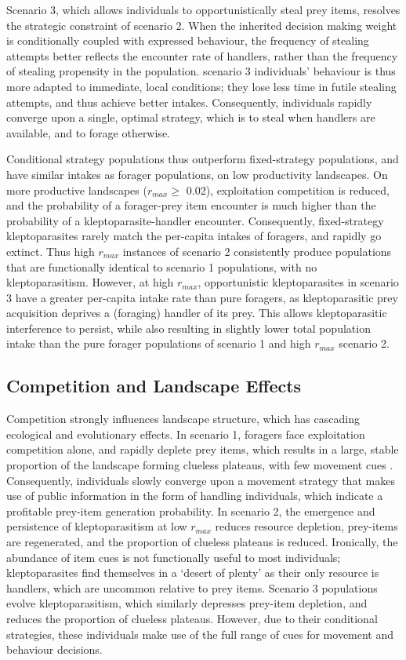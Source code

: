 \documentclass[11pt]{article}
\begin{document}
Scenario 3, which allows individuals to opportunistically steal prey items, resolves the strategic constraint of scenario 2.
When the inherited decision making weight is conditionally coupled with expressed behaviour, the frequency of stealing attempts better reflects the encounter rate of handlers, rather than the frequency of stealing propensity in the population.
scenario 3 individuals' behaviour is thus more adapted to immediate, local conditions; they lose less time in futile stealing attempts, and thus achieve better intakes.
Consequently, individuals rapidly converge upon a single, optimal strategy, which is to steal when handlers are available, and to forage otherwise.

Conditional strategy populations thus outperform fixed-strategy populations, and have similar intakes as forager populations, on low productivity landscapes.
On more productive landscapes ($r_{max} \geq$ 0.02), exploitation competition is reduced, and the probability of a forager-prey item encounter is much higher than the probability of a kleptoparasite-handler encounter.
Consequently, fixed-strategy kleptoparasites rarely match the per-capita intakes of foragers, and rapidly go extinct.
Thus high $r_{max}$ instances of scenario 2 consistently produce populations that are functionally identical to scenario 1 populations, with no kleptoparasitism.
However, at high $r_{max}$, opportunistic kleptoparasites in scenario 3 have a greater per-capita intake rate than pure foragers, as kleptoparasitic prey acquisition deprives a (foraging) handler of its prey. 
This allows kleptoparasitic interference to persist, while also resulting in slightly lower total population intake than the pure forager populations of scenario 1 and high $r_{max}$ scenario 2.

\subsection{Competition and Landscape Effects}

Competition strongly influences landscape structure, which has cascading ecological and evolutionary effects.
In scenario 1, foragers face exploitation competition alone, and rapidly deplete prey items, which results in a large, stable proportion of the landscape forming clueless plateaus, with few movement cues \citep{perkins1992}.
Consequently, individuals slowly converge upon a movement strategy that makes use of public information in the form of handling individuals, which indicate a profitable prey-item generation probability.
In scenario 2, the emergence and persistence of kleptoparasitism at low $r_{max}$ reduces resource depletion, prey-items are regenerated, and the proportion of clueless plateaus is reduced.
Ironically, the abundance of item cues is not functionally useful to most individuals; kleptoparasites find themselves in a `desert of plenty' as their only resource is handlers, which are uncommon relative to prey items.
Scenario 3 populations evolve kleptoparasitism, which similarly depresses prey-item depletion, and reduces the proportion of clueless plateaus.
However, due to their conditional strategies, these individuals make use of the full range of cues for movement and behaviour decisions.
\end{document}
